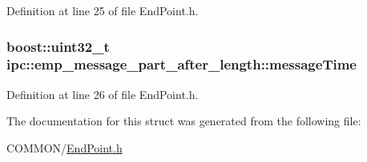 Definition at line 25 of file End\+Point.\+h.

\subsubsection[{\texorpdfstring{message\+Time}{messageTime}}]{\setlength{\rightskip}{0pt plus 5cm}boost\+::uint32\+\_\+t ipc\+::emp\+\_\+message\+\_\+part\+\_\+after\+\_\+length\+::message\+Time}\hypertarget{structipc_1_1emp__message__part__after__length_aa3063ea0ba9535359c290d34a2a43d46}{}\label{structipc_1_1emp__message__part__after__length_aa3063ea0ba9535359c290d34a2a43d46}


Definition at line 26 of file End\+Point.\+h.



The documentation for this struct was generated from the following file\+:\begin{DoxyCompactItemize}
\item 
C\+O\+M\+M\+O\+N/\hyperlink{EndPoint_8h}{End\+Point.\+h}\end{DoxyCompactItemize}
